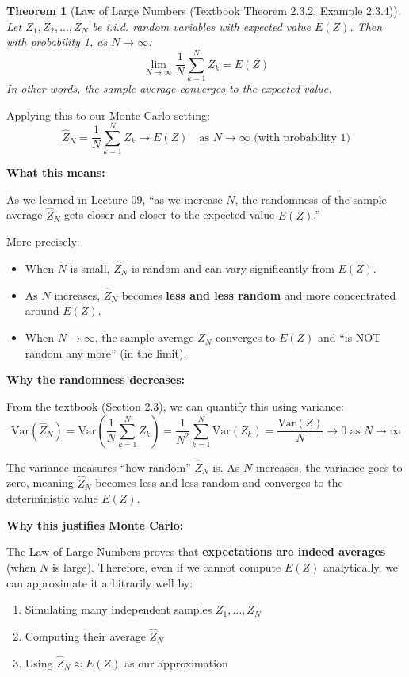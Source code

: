 \documentclass[11pt]{article}
\newtheorem{theorem}{Theorem}
\begin{document}
\begin{theorem}[Law of Large Numbers (Textbook Theorem 2.3.2, Example 2.3.4)]
Let $Z_1, Z_2, \ldots, Z_N$ be i.i.d. random variables with expected value $E(Z)$. Then with probability 1, as $N \to \infty$:
\[
\lim_{N \to \infty} \frac{1}{N} \sum_{k=1}^{N} Z_k = E(Z)
\]
In other words, the sample average converges to the expected value.
\end{theorem}

\noindent
Applying this to our Monte Carlo setting:
\[
\hat{Z}_N = \frac{1}{N} \sum_{k=1}^{N} Z_k \to E(Z) \quad \text{as } N \to \infty \text{ (with probability 1)}
\]

\vspace{0.5em}

\textbf{What this means:}

As we learned in Lecture 09, ``as we increase $N$, the randomness of the sample average $\hat{Z}_N$ gets closer and closer to the expected value $E(Z)$.''

More precisely:
\begin{itemize}[leftmargin=2em]
    \item When $N$ is small, $\hat{Z}_N$ is random and can vary significantly from $E(Z)$.
    \item As $N$ increases, $\hat{Z}_N$ becomes \textbf{less and less random} and more concentrated around $E(Z)$.
    \item When $N \to \infty$, the sample average $\hat{Z}_N$ converges to $E(Z)$ and ``is NOT random any more'' (in the limit).
\end{itemize}

\vspace{0.5em}

\textbf{Why the randomness decreases:}

From the textbook (Section 2.3), we can quantify this using variance:
\[
\text{Var}(\hat{Z}_N) = \text{Var}\left(\frac{1}{N} \sum_{k=1}^{N} Z_k\right) = \frac{1}{N^2} \sum_{k=1}^{N} \text{Var}(Z_k) = \frac{\text{Var}(Z)}{N} \to 0 \text{ as } N \to \infty
\]

The variance measures ``how random'' $\hat{Z}_N$ is. As $N$ increases, the variance goes to zero, meaning $\hat{Z}_N$ becomes less and less random and converges to the deterministic value $E(Z)$.

\vspace{0.5em}

\textbf{Why this justifies Monte Carlo:}

The Law of Large Numbers proves that \textbf{expectations are indeed averages} (when $N$ is large). Therefore, even if we cannot compute $E(Z)$ analytically, we can approximate it arbitrarily well by:
\begin{enumerate}[leftmargin=2em]
    \item Simulating many independent samples $Z_1, \ldots, Z_N$
    \item Computing their average $\hat{Z}_N$
    \item Using $\hat{Z}_N \approx E(Z)$ as our approximation
\end{enumerate}
\end{document}
